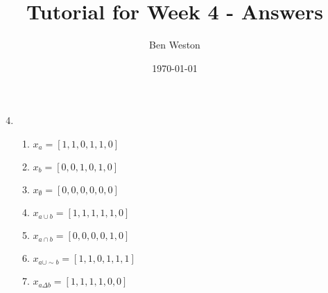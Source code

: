 \documentclass{article}
\title{Tutorial for Week 4 - Answers}
\author{Ben Weston}
\date{\today}
\begin{document}
\maketitle
\begin{enumerate}\setcounter{enumi}{3}
        \item{
                        \begin{enumerate}
                                \item $x_a=[1,1,0,1,1,0]$
                                \item $x_b=[0,0,1,0,1,0]$
                                \item $x_\emptyset=[0,0,0,0,0,0]$
                                \item $x_{a\cup b}=[1,1,1,1,1,0]$
                                \item $x_{a\cap b}=[0,0,0,0,1,0]$
                                \item $x_{a\cup\sim b}=[1,1,0,1,1,1]$
                                \item $x_{a\Delta b}=[1,1,1,1,0,0]$
                        \end{enumerate}
                }
\end{enumerate}
\end{document}
